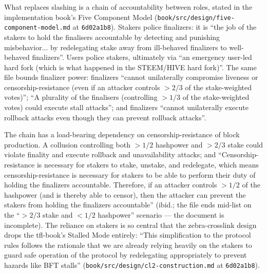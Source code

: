 \documentclass[11pt,a4paper]{article}
\theoremstyle{definition}
\begin{document}
What replaces slashing is a chain of accountability between roles, stated
in the implementation book's Five Component Model
(\texttt{book/src/design/five-component-model.md} at \texttt{6d02a1b8}).
Stakers police finalizers: it is ``the job of the stakers to hold the
finalisers accountable by detecting and punishing misbehavior... by
redelegating stake away from ill-behaved finalizers to well-behaved
finalizers''. Users police stakers, ultimately via ``an emergency
user-led hard fork (which is what happened in the STEEM/HIVE hard
fork)''. The same file bounds finalizer power: finalizers ``cannot
unilaterally compromise liveness or censorship-resistance (even if an
attacker controls $>2/3$ of the stake-weighted votes)''; ``A plurality of
the finalisers (controlling $>1/3$ of the stake-weighted votes) could
execute stall attacks''; and finalizers ``cannot unilaterally execute
rollback attacks even though they can prevent rollback attacks''.

The chain has a load-bearing dependency on censorship-resistance of block
production. A collusion controlling both $>1/2$ hashpower and $>2/3$
stake could violate finality and execute rollback and unavailability
attacks; and ``Censorship-resistance is necessary for stakers to stake,
unstake, and redelegate, which means censorship-resistance is necessary
for stakers to be able to perform their duty of holding the finalizers
accountable. Therefore, if an attacker controls $>1/2$ of the hashpower
(and is thereby able to censor), then the attacker can prevent the
stakers from holding the finalizers accountable'' (ibid.; the file ends
mid-list on the ``$>2/3$ stake and $<1/2$ hashpower'' scenario --- the
document is incomplete). The reliance on stakers is so central that the
zebra-crosslink design drops the tfl-book's Stalled Mode entirely: ``This
simplification to the protocol rules follows the rationale that we are
already relying heavily on the stakers to guard safe operation of the
protocol by redelegating appropriately to prevent hazards like BFT
stalls'' (\texttt{book/src/design/cl2-construction.md} at
\texttt{6d02a1b8}).
\end{document}
